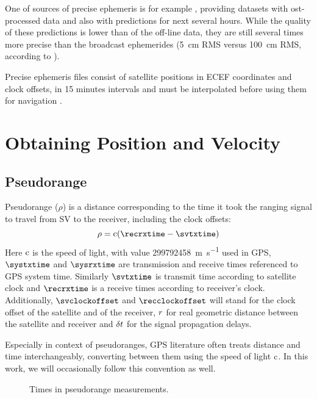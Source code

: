 One of sources of precise ephemeris is for example \cite{orbit-data}, providing datasets with
ost-processed data and also with predictions for next several hours.
While the quality of these predictions is lower than of the off-line data,
they are still several times more precise than the broadcast ephemerides
(\SI{5}{\centi\meter} RMS versus \SI{100}{\centi\meter} RMS, according to \cite{orbit-data}).

Precise ephemeris files consist of satellite positions in ECEF
coordinates and clock offsets, in 15 minutes intervals and must be interpolated
before using them for navigation \cite{schenewerk03}.

\section{Obtaining Position and Velocity}


\subsection{Pseudorange}
\label{sec:pseudorange}

Pseudorange (\(\rho\)) is a distance corresponding to the time it took the ranging
signal to travel from SV to the receiver, including the clock offsets:
\begin{equation}
	\label{eq:pseudorange}
	\rho = \speedoflight (\recrxtime - \svtxtime)
\end{equation}
Here \(\mathrm{c}\) is the speed of light, with value \SI{299792458}{\meter\per\second} used in GPS,
\(\systxtime\) and \(\sysrxtime\) are transmission and receive times referenced to GPS system time.
Similarly \(\svtxtime\) is transmit time according to satellite clock and
\(\recrxtime\) is a receive times according to receiver's clock.
Additionally, \(\svclockoffset\) and \(\recclockoffset\) will stand for the clock offset of the satellite
and of the receiver, \(r\) for real geometric distance between the satellite and receiver
and \(\delta{t}\) for the signal propagation delays.

Especially in context of pseudoranges, GPS literature often treats distance and time
interchangeably, converting between them using the speed of light \(\mathrm{c}\).
In this work, we will occasionally follow this convention as well.

\begin{figure}[tb]
	\centering
	
	\caption{Times in pseudorange measurements.}
	\label{fig:pseudorange}
\end{figure}

